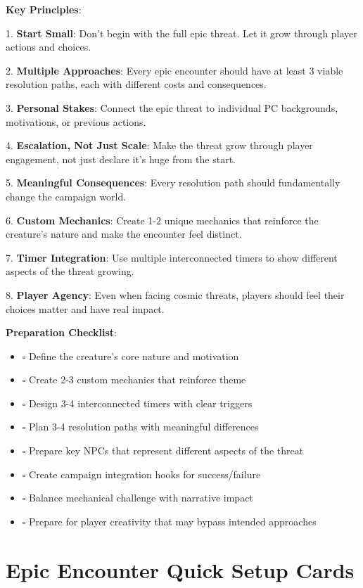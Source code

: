 \documentclass[11pt]{article}
\begin{document}
\begin{mdframed}[backgroundcolor=epicbg]
\textbf{Key Principles}:

1. \textbf{Start Small}: Don't begin with the full epic threat. Let it grow through player actions and choices.

2. \textbf{Multiple Approaches}: Every epic encounter should have at least 3 viable resolution paths, each with different costs and consequences.

3. \textbf{Personal Stakes}: Connect the epic threat to individual PC backgrounds, motivations, or previous actions.

4. \textbf{Escalation, Not Just Scale}: Make the threat grow through player engagement, not just declare it's huge from the start.

5. \textbf{Meaningful Consequences}: Every resolution path should fundamentally change the campaign world.

6. \textbf{Custom Mechanics}: Create 1-2 unique mechanics that reinforce the creature's nature and make the encounter feel distinct.

7. \textbf{Timer Integration}: Use multiple interconnected timers to show different aspects of the threat growing.

8. \textbf{Player Agency}: Even when facing cosmic threats, players should feel their choices matter and have real impact.

\textbf{Preparation Checklist}:
\begin{itemize}[leftmargin=*]
\item $\square$ Define the creature's core nature and motivation
\item $\square$ Create 2-3 custom mechanics that reinforce theme
\item $\square$ Design 3-4 interconnected timers with clear triggers
\item $\square$ Plan 3-4 resolution paths with meaningful differences
\item $\square$ Prepare key NPCs that represent different aspects of the threat
\item $\square$ Create campaign integration hooks for success/failure
\item $\square$ Balance mechanical challenge with narrative impact
\item $\square$ Prepare for player creativity that may bypass intended approaches
\end{itemize}
\end{mdframed}

\section*{Epic Encounter Quick Setup Cards}
\end{document}
